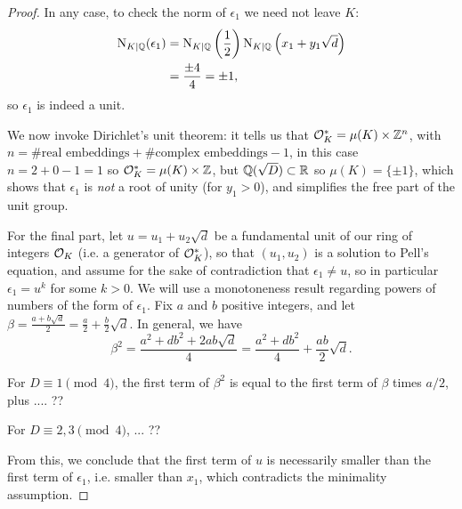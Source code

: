 \begin{proof}
	In any case, to check the norm of $\epsilon_1$ we need not leave $K$:
	\begin{align*}
		\operatorname{N}_{K\mid\mathbb{Q}}(\epsilon_1) &= \operatorname{N}_{K\mid\mathbb{Q}}\left(\frac{1}{2}\right)\operatorname{N}_{K\mid\mathbb{Q}}\left(x_1+y_1\sqrt{d}\right)\\
			&= \frac{\pm 4}{4} = \pm 1,
	\end{align*}
	so $\epsilon_1$ is indeed a unit.

	We now invoke Dirichlet's unit theorem: it tells us that $\mathcal{O}^*_K = \mu(K)\times \mathbb{Z}^n$, with $n=\#\text{real embeddings}+\#\text{complex embeddings}-1$, in this case $n=2+0-1=1$ so $\mathcal{O}^*_K = \mu(K)\times\mathbb{Z}$, but $\mathbb{Q}(\sqrt{D})\subset \mathbb{R}$ so $\mu(K)=\{\pm 1\}$, which shows that $\epsilon_1$ is \emph{not} a root of unity (for $y_1>0$), and simplifies the free part of the unit group.

	For the final part, let $u=u_1+u_2\sqrt{d}$ be a fundamental unit of our ring of integers $\mathcal{O}_K$ (i.e. a generator of $\mathcal{O}^*_K$), so that $(u_1,u_2)$ is a solution to Pell's equation, and assume for the sake of contradiction that $\epsilon_1\neq u$, so in particular $\epsilon_1=u^k$ for some $k>0$. We will use a monotoneness result regarding powers of numbers of the form of $\epsilon_1$. Fix $a$ and $b$ positive integers, and let $\beta = \frac{a+b\sqrt{d}}{2} = \frac{a}{2} + \frac{b}{2}\sqrt{d}$. In general, we have
	\[
		\beta^2 = \frac{a^2+db^2+2ab\sqrt{d}}{4} = \frac{a^2+db^2}{4} + \frac{ab}{2}\sqrt{d}.
	\]

	For $D\equiv 1 \pmod{4}$, the first term of $\beta^2$ is equal to the first term of $\beta$ times $a/2$, plus .... ??

	For $D\equiv 2,3 \pmod{4}$, ... ??

	From this, we conclude that the first term of $u$ is necessarily smaller than the first term of $\epsilon_1$, i.e. smaller than $x_1$, which contradicts the minimality assumption.

\end{proof}
